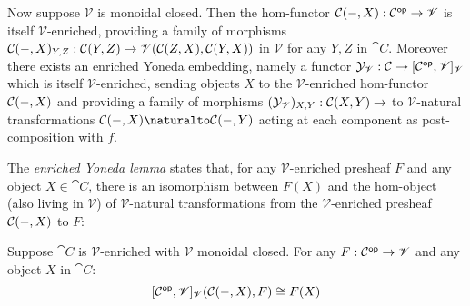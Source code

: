\noindent Now suppose $\mathscr{V}$ is monoidal closed. Then the hom-functor ${\mathcal{C}}(-,X): \mathcal{C}^{\mathsf{op}}
\to \mathscr{V}$ is itself $\mathscr{V}$-enriched, providing a family of morphisms ${\mathcal{C}}(-,X)_{Y,Z}:
{\mathcal{C}}(Y,Z) \to {\mathscr{V}}({\mathcal{C}}(Z,X),{\mathcal{C}}(Y,X))$ in $\mathscr{V}$ for any
$Y, Z$ in $\cat{C}$. Moreover there exists an enriched Yoneda embedding, namely a functor
$\mathcal{Y}_{\mathscr{V}}: \mathcal{C} \to [\mathcal{C}^{\mathsf{op}},\mathscr{V}]_{\mathscr{V}}$ which is itself
$\mathscr{V}$-enriched, sending objects $X$ to the $\mathscr{V}$-enriched hom-functor ${\mathcal{C}}(-,X)$
and providing a family of morphisms $(\mathcal{Y}_{\mathscr{V}})_{X,Y}: {\mathcal{C}}(X,Y) \to $ to
$\mathscr{V}$-natural transformations $\Hom{\cat{C}}{-}{X} \naturalto \Hom{\cat{C}}{-}{Y}$ acting at each
component as post-composition with $f$.

The \emph{enriched Yoneda lemma} states that, for any $\mathscr{V}$-enriched presheaf $F$ and any object $X
\in \cat{C}$, there is an isomorphism between $F(X)$ and the hom-object (also living in $\mathscr{V}$) of
$\mathscr{V}$-natural transformations from the $\mathscr{V}$-enriched presheaf ${\mathcal{C}}(-,X)$ to $F$:

\begin{lemma}
Suppose $\cat{C}$ is $\mathscr{V}$-enriched with $\mathscr{V}$ monoidal closed. For any $F: \mathcal{C}^{\mathsf{op}} \to
\mathscr{V}$ and any object $X$ in $\cat{C}$:
\[{[\mathcal{C}^{\mathsf{op}},\mathscr{V}]_{\mathscr{V}}}({\mathcal{C}}(-,X),F) \cong F(X)\]
\end{lemma}


%
%
%

